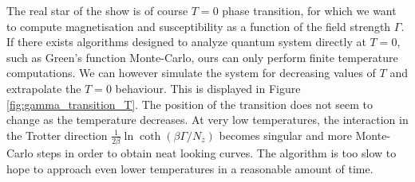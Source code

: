 \documentclass[11pt,openany]{article}
\begin{document}
The real star of the show is of course $T=0$ phase transition, for which we want to compute magnetisation and susceptibility as a function of the field strength $\Gamma$. If there exists algorithms designed to analyze quantum system directly at $T=0$, such as Green's function Monte-Carlo, ours can only perform finite temperature computations. We can however simulate the system for decreasing values of $T$ and extrapolate the $T=0$ behaviour. This is displayed in Figure \ref{fig:gamma_transition_T}. The position of the transition does not seem to change as the temperature decreases. At very low temperatures, the interaction in the Trotter direction $ \frac{1}{2\beta}\ln\coth(\beta\Gamma/N_z)$ becomes singular and more Monte-Carlo steps in order to obtain neat looking curves. The algorithm is too slow to hope to approach even lower temperatures in a reasonable amount of time.
\end{document}

